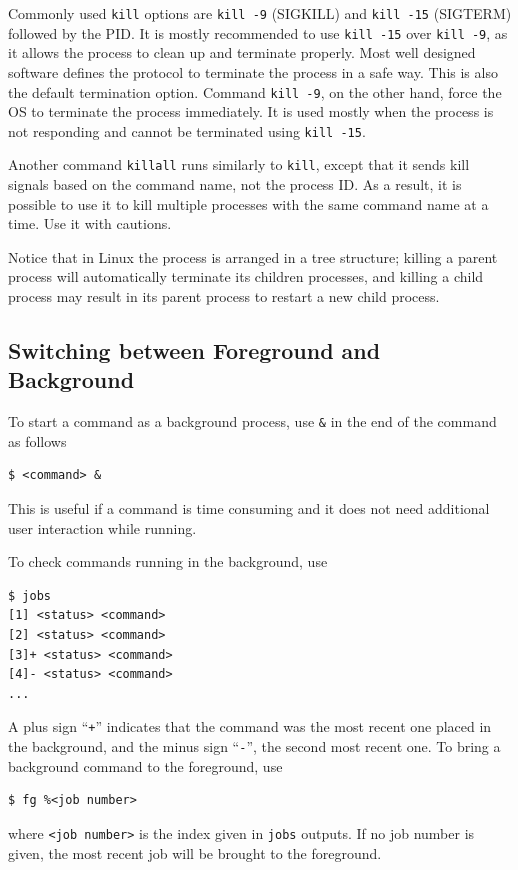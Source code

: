 Commonly used \verb|kill| options are \verb|kill -9| (SIGKILL) and \verb|kill -15| (SIGTERM) followed by the PID. It is mostly recommended to use \verb|kill -15| over \verb|kill -9|, as it allows the process to clean up and terminate properly. Most well designed software defines the protocol to terminate the process in a safe way. This is also the default termination option. Command \verb|kill -9|, on the other hand, force the OS to terminate the process immediately. It is used mostly when the process is not responding and cannot be terminated using \verb|kill -15|.

Another command \verb|killall| runs similarly to \verb|kill|, except that it sends kill signals based on the command name, not the process ID. As a result, it is possible to use it to kill multiple processes with the same command name at a time. Use it with cautions.

Notice that in Linux the process is arranged in a tree structure; killing a parent process will automatically terminate its children processes, and killing a child process may result in its parent process to restart a new child process.

\subsection{Switching between Foreground and Background}

To start a command as a background process, use \verb|&| in the end of the command as follows
\begin{lstlisting}
$ <command> &
\end{lstlisting}
This is useful if a command is time consuming and it does not need additional user interaction while running.

To check commands running in the background, use
\begin{lstlisting}
$ jobs
[1] <status> <command>
[2] <status> <command>
[3]+ <status> <command>
[4]- <status> <command>
...
\end{lstlisting}
A plus sign ``\verb|+|'' indicates that the command was the most recent one placed in the background, and the minus sign ``\verb|-|'', the second most recent one. To bring a background command to the foreground, use
\begin{lstlisting}
$ fg %<job number>
\end{lstlisting}
where \verb|<job number>| is the index given in \verb|jobs| outputs. If no job number is given, the most recent job will be brought to the foreground.

